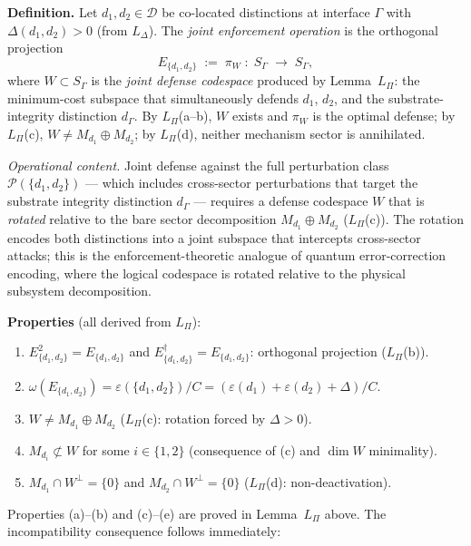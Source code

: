 \documentclass[11pt]{article}
\theoremstyle{remark}
\begin{document}
\begin{tcolorbox}[defbox, title={Definition FD6: Joint Enforcement Operation (from $L_\Pi$)}]
\label{def:FD6}
\textbf{Definition.}  Let $d_1, d_2 \in \mathcal{D}$ be co-located distinctions at interface $\Gamma$ with $\Delta(d_1,d_2) > 0$ (from $L_\Delta$).  The \emph{joint enforcement operation} is the orthogonal projection
\[
E_{\{d_1,d_2\}} \;:=\; \pi_W \;:\; S_\Gamma \;\longrightarrow\; S_\Gamma,
\]
where $W \subset S_\Gamma$ is the \emph{joint defense codespace} produced by Lemma~$L_\Pi$: the minimum-cost subspace that simultaneously defends $d_1$, $d_2$, and the substrate-integrity distinction $d_\Gamma$.  By $L_\Pi$(a--b), $W$ exists and $\pi_W$ is the optimal defense; by $L_\Pi$(c), $W \ne M_{d_1} \oplus M_{d_2}$; by $L_\Pi$(d), neither mechanism sector is annihilated.

\smallskip\noindent\textit{Operational content.}  Joint defense against the full perturbation class $\mathcal{P}(\{d_1,d_2\})$ --- which includes cross-sector perturbations that target the substrate integrity distinction $d_\Gamma$ --- requires a defense codespace $W$ that is \emph{rotated} relative to the bare sector decomposition $M_{d_1} \oplus M_{d_2}$ ($L_\Pi$(c)).  The rotation encodes both distinctions into a joint subspace that intercepts cross-sector attacks; this is the enforcement-theoretic analogue of quantum error-correction encoding, where the logical codespace is rotated relative to the physical subsystem decomposition.

\smallskip\noindent\textbf{Properties} (all derived from $L_\Pi$):
\begin{enumerate}[nosep,leftmargin=2em,itemsep=3pt,label=(\alph*)]
  \item $E_{\{d_1,d_2\}}^2 = E_{\{d_1,d_2\}}$ and $E_{\{d_1,d_2\}}^\dagger = E_{\{d_1,d_2\}}$: orthogonal projection ($L_\Pi$(b)).
  \item $\omega(E_{\{d_1,d_2\}}) = \varepsilon(\{d_1,d_2\})/C = (\varepsilon(d_1)+\varepsilon(d_2)+\Delta)/C$.
  \item $W \ne M_{d_1} \oplus M_{d_2}$ ($L_\Pi$(c): rotation forced by $\Delta > 0$).
  \item $M_{d_i} \not\subset W$ for some $i \in \{1,2\}$ (consequence of (c) and $\dim W$ minimality).
  \item $M_{d_1} \cap W^\perp = \{0\}$ and $M_{d_2} \cap W^\perp = \{0\}$ ($L_\Pi$(d): non-deactivation).
\end{enumerate}

\smallskip\noindent Properties (a)--(b) and (c)--(e) are proved in Lemma~$L_\Pi$ above.  The incompatibility consequence follows immediately:


\end{tcolorbox}
\end{document}
